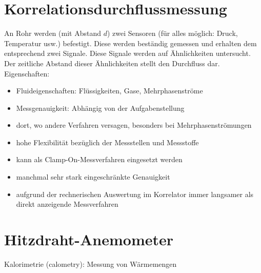 \documentclass{scrreprt}
\begin{document}
\section{Korrelationsdurchflussmessung}
An Rohr werden (mit Abstand $d$) zwei Sensoren (für alles möglich: Druck, Temperatur usw.) befestigt. Diese werden beständig gemessen und erhalten dem entsprechend zwei Signale. Diese Signale werden auf Ähnlichkeiten untersucht. Der zeitliche Abstand dieser Ähnlichkeiten stellt den Durchfluss dar.\\
Eigenschaften:
\begin{itemize}
\item Fluideigenschaften: Flüssigkeiten, Gase, Mehrphasenströme
\item Messgenauigkeit: Abhängig von der Aufgabenstellung
\end{itemize}
\begin{itemize}[label=$+$]
\item dort, wo andere Verfahren versagen, besonders bei Mehrphasenströmungen
\item hohe Flexibilität bezüglich der Messstellen und Messstoffe
\item kann als Clamp-On-Messverfahren eingesetzt werden
\end{itemize}
\begin{itemize}[label=$-$]
\item manchmal sehr stark eingeschränkte Genauigkeit
\item aufgrund der rechnerischen Auswertung im Korrelator immer langsamer als direkt anzeigende Messverfahren
\end{itemize}

\section{Hitzdraht-Anemometer}
Kalorimetrie (calometry): Messung von Wärmemengen
\end{document}
